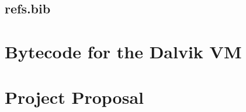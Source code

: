 \documentclass[12pt,twoside,notitlepage]{report}
\begin{document}
\section{refs.bib}
{\scriptsize}


\cleardoublepage

\chapter{Bytecode for the Dalvik VM}

% 


\cleardoublepage

\chapter{Project Proposal}


\end{document}
